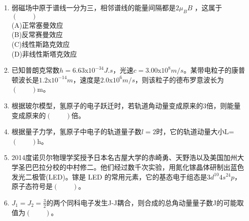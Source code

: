 \begin{enumerate}
(A)K壳层\\
(B)L壳层\\
(C)M壳展\\
(D)N壳层
\item 弱磁场中原于谱线一分为三，相邻谱线的能量间隔都是$2\mu_B B$ ，这属于$(\qquad)$\\
(A)正常塞曼效应\\
(B)反常赛曼效应 \\
(C)线性斯路克效应 \\
(D)非线性斯塔克效应
\item 已知普朗克常数$h=6.63$x$10^{-34}J.s$，光速$c=3.00$x$10^8 m/s$。某带电粒子的康普顿波长是$1.2$x$10^{-14}m$，速度是$2.0$x$10^6 m/s$，则该粒子的德布罗意波长为$(\qquad)$m。
\item 根据玻尔模型，氢原子的电子跃迁时，若轨道角动量变成原来的3倍，则能量变成原来的$(\qquad)$倍。
\item 根据量子力学，氢原子中电子的轨道量子数$l=2$时，它的轨道动量大小L=$(\qquad)$h。
\item 2014度诺贝尔物理学奖授予日本名古屋大学的赤崎勇、天野浩以及美国加州大学圣巴巴拉分校的中村修二。他们经过数千次实验，用氮化镓晶体研制出蓝色发光二极管(LED)。镓是 LED 的常用元素，它的基态电于组态是$3d^{10}4s^24p$，原子态符号是$(\qquad)$。
\item $J_1=J_2=\frac{3}{2}$的两个同科电子发生J-J耦合，则合成的总角动量量子数J的可能取值为$(\qquad)$。
\end{enumerate}

